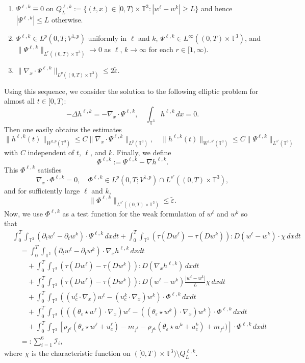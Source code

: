 \documentclass[10pt,reqno]{amsart}
\numberwithin{equation}{section}
\newcommand{\T}{\mathbb T}
\newcommand{\bq}{\begin{equation}}
\newcommand{\eq}{\end{equation}}
\newcommand{\e}{\varepsilon}
\newcommand{\te}{\tilde\varepsilon}
\newcommand{\pa}{\partial}
\newcommand{\intt}{\int_{\T^3}}
\begin{document}
\begin{enumerate}
\item
$\Psi^{\ell,k} \equiv 0$ on $Q_L^{\ell,k} := \{ (t,x) \in [0,T)\times\T^3  :  |w^\ell - w^k| \ge L\}$ and hence $|\Psi^{\ell,k}|\le L$ otherwise.
\item
$\Psi^{\ell,k} \in L^p(0,T; V^{1,p})$ uniformly in $\ell$ and $k$, $\Psi^{\ell, k} \in L^\infty((0,T)\times\T^3)$,   and $\|\Psi^{\ell,k}\|_{L^r((0,T)\times\T^3)} \to 0$ as $\ell$, $k\to \infty$ for each $r \in [1,\infty)$.
\item
$\|\nabla_x \cdot \Psi^{\ell, k}\|_{L^p((0,T)\times\T^3)} \le 2\te.$
\end{enumerate}
Using this sequence, we consider the solution to the following elliptic problem for almost all $t \in [0,T)$:
\[
-\Delta h^{\ell, k} = -\nabla_x \cdot \Psi^{\ell,k}, \quad \intt h^{\ell, k}\,dx =0.
\]
Then one easily obtains the estimates
\[
\|h^{\ell, k}(t)\|_{W^{2,p}(\T^3)} \le C\|\nabla_x \cdot \Psi^{\ell, k}\|_{L^p(\T^3)}, \quad \|h^{\ell,k}(t)\|_{W^{1,s'}(\T^3)} \le C\|\Psi^{\ell,k}\|_{L^{s'}(\T^3)}
\]
with $C$ independent of $t$, $\ell$, and $k$. Finally, we define
\[
\Phi^{\ell,k} := \Psi^{\ell,k} - \nabla h^{\ell,k}.
\]
This $\Phi^{\ell,k}$ satisfies
\[
\nabla_x \cdot \Phi^{\ell,k} = 0, \quad \Phi^{\ell,k} \in L^p(0,T;V^{1,p}) \cap L^{s'}((0,T)\times\T^3),
\]
and for sufficiently large $\ell$ and $k$,  
\bq\label{Psi_ep}
\|\Phi^{\ell,k}\|_{L^{s'}((0,T)\times\T^3)} \le \te.
\eq
Now, we use $\Phi^{\ell,k}$ as a test function for the weak formulation of $w^\ell$ and $w^k$ so that 
\begin{align*}
&\int_0^T\intt (\pa_t w^\ell - \pa_t w^k)\cdot \Psi^{\ell,k}\,dxdt + \int_0^T \intt (\tau(Dw^\ell) - \tau(Dw^k)): D(w^\ell - w^k) \cdot \chi\,dxdt\\
 &\quad= \int_0^T \intt (\pa_t w^\ell - \pa_t w^k)\cdot \nabla_x  h^{\ell,k}\,dxdt\\
 &\qquad + \int_0^T \intt (\tau(Dw^\ell) - \tau(Dw^k)): D(\nabla_x h^{\ell,k})\,dxdt\\
 &\qquad + \int_0^T \intt (\tau(Dw^\ell) - \tau(Dw^k)): D(w^\ell - w^k) \frac{|w^\ell - w^k|}{L}\chi\,dxdt\\
 &\qquad +  \int_0^T \intt ((u_c^\ell \cdot \nabla_x) w^\ell  - (u_c^k \cdot \nabla_x ) w^k)  \cdot \Phi^{\ell,k}\,dxdt\\
 &\qquad + \int_0^T \intt ( ((\theta_\e \star w^\ell)\cdot \nabla_x) w^\ell - ((\theta_\e \star w^k)\cdot \nabla_x) w^k)\cdot \Phi^{\ell,k}\,dxdt\\
 &\qquad + \int_0^T \intt [\rho_{f^\ell} (\theta_\e \star w^\ell + u_c^\ell) - m_{f^\ell} - \rho_{f^k} ( \theta_\e \star w^k + u_c^k) + m_{f^k})]\cdot \Phi^{\ell,k}\,dxdt\\
 &\quad=: \sum_{i=1}^6 \mathcal{I}_i,
\end{align*}
where $\chi$ is the characteristic function on $([0,T)\times\T^3) \setminus Q_L^{\ell,k}$.
 
\end{document}
